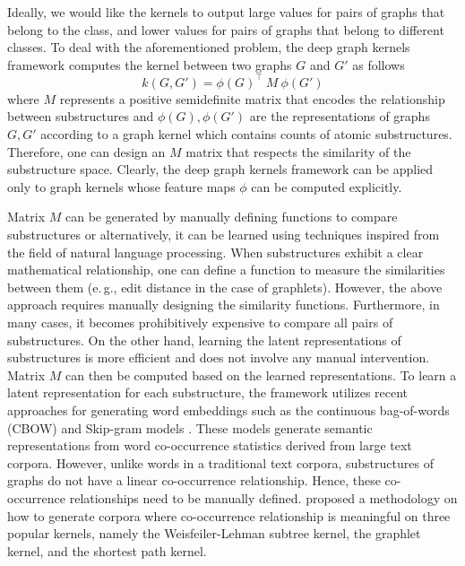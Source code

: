 \documentclass[twoside,11pt]{article}
\newcommand{\eg}{e.\,g., }
\begin{document}
Ideally, we would like the kernels to output large values for pairs of graphs that belong to the class, and lower values for pairs of graphs that belong to different classes.
To deal with the aforementioned problem, the deep graph kernels framework computes the kernel between two graphs $G$ and $G'$ as follows
\begin{equation}
    k(G,G') = \phi(G)^\top \ M \ \phi(G')
\end{equation}
where $M$ represents a positive semidefinite matrix that encodes the relationship between substructures and $\phi(G), \phi(G')$ are the representations of graphs $G, G'$ according to a graph kernel which contains counts of atomic substructures.
Therefore, one can design an $M$ matrix that respects the similarity of the substructure space.
Clearly, the deep graph kernels framework can be applied only to graph kernels whose feature maps $\phi$ can be computed explicitly.

Matrix $M$ can be generated by manually defining functions to compare substructures or alternatively, it can be learned using techniques inspired from the field of natural language processing.
When substructures exhibit a clear mathematical relationship, one can define a function to measure the similarities between them (\eg edit distance in the case of graphlets).
However, the above approach requires manually designing the similarity functions.
Furthermore, in many cases, it becomes prohibitively expensive to compare all pairs of substructures.
On the other hand, learning the latent representations of substructures is more efficient and does not involve any manual intervention.
Matrix $M$ can then be computed based on the learned representations.
To learn a latent representation for each substructure, the framework utilizes recent approaches for generating word embeddings such as the continuous bag-of-words (CBOW) and Skip-gram models .
These models generate semantic representations from word co-occurrence statistics derived from large text corpora.
However, unlike words in a traditional text corpora, substructures of graphs do not have a linear co-occurrence relationship.
Hence, these co-occurrence relationships need to be manually defined. 
 proposed a methodology on how to generate corpora where co-occurrence relationship is meaningful on three popular kernels, namely the Weisfeiler-Lehman subtree kernel, the graphlet kernel, and the shortest path kernel.
\end{document}
